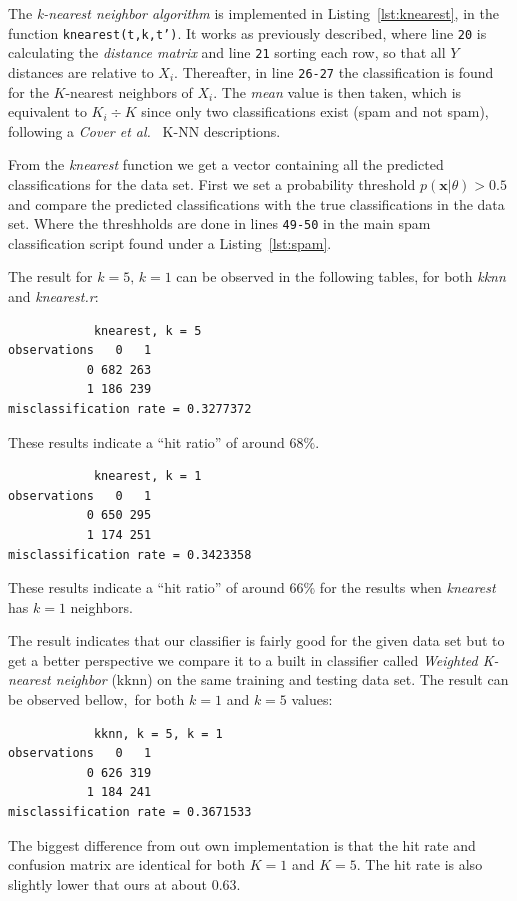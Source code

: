 \documentclass[a4paper, twocolumn]{article}
\begin{document}
    The \emph{k-nearest neighbor algorithm} is implemented in Listing~\ref{lst:knearest}, in the function \texttt{knearest(t,k,t')}. It works as previously described, where line \texttt{20} is calculating the \emph{distance matrix} and line \texttt{21} sorting each row, so that all $Y$ distances are relative to $X_i$. Thereafter, in line \texttt{26-27} the classification is found for the $K$-nearest neighbors of $X_i$. The \emph{mean} value is then taken, which is equivalent to $K_i \div K$ since only two classifications exist (spam and not spam), following a \emph{Cover et al.}~\cite{cover1967nearest} K-NN descriptions.

    From the \textit{knearest} function we get a vector containing all the predicted classifications for the data set. First we set a probability threshold \( p(\mathbf{x} |\theta) > 0.5\) and compare the predicted classifications with the true classifications in the data set. Where the threshholds are done in lines \texttt{49-50} in the main spam classification script found under a Listing~\ref{lst:spam}.

    The result for \(k = 5,\, k = 1\) can be observed in the following tables, for both \emph{kknn} and \emph{knearest.r}:
\begin{verbatim}
            knearest, k = 5
observations   0   1
           0 682 263
           1 186 239
misclassification rate = 0.3277372
\end{verbatim}
    These results indicate a ``hit ratio'' of around \(68 \%\).

\begin{verbatim}
            knearest, k = 1
observations   0   1
           0 650 295
           1 174 251
misclassification rate = 0.3423358
\end{verbatim}
    These results indicate a ``hit ratio'' of around \(66 \%\) for the results when \emph{knearest} has $k=1$ neighbors.

    The result indicates that our classifier is fairly good for the given data set but to get a better perspective we compare it to a built in classifier called \textit{Weighted K-nearest neighbor} (kknn) on the same training and testing data set. The result can be observed bellow,\, for both $k=1$ and $k=5$ values:

\begin{verbatim}
            kknn, k = 5, k = 1
observations   0   1
           0 626 319
           1 184 241
misclassification rate = 0.3671533
\end{verbatim}
    The biggest difference from out own implementation is that the hit rate and confusion matrix are identical for both \(K = 1\) and \(K = 5\). The hit rate is also slightly lower that ours at about \( 0.63\).
\end{document}
